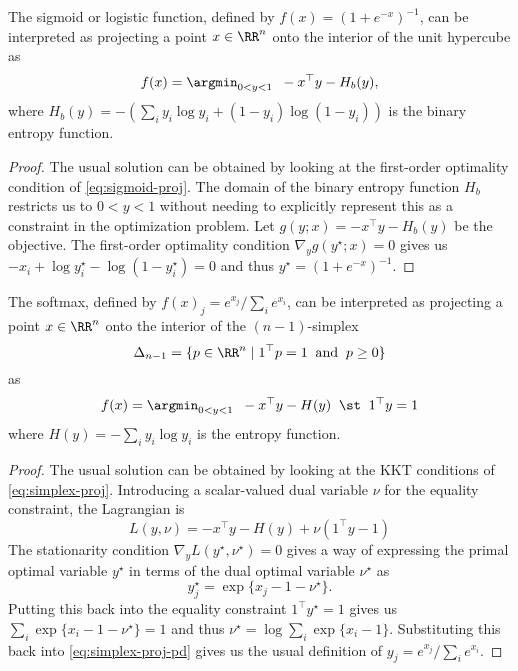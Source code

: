 \newpage
\begin{theorem}
  The sigmoid or logistic function, defined by $f(x) = (1+e^{-x})^{-1}$,
  can be interpreted as projecting a point $x\in\RR^n$ onto
  the interior of the unit hypercube as
  \begin{equation}
    f(x) = \argmin_{0<y<1} \;\; -x^\top y -H_b(y),
    \label{eq:sigmoid-proj}
  \end{equation}
  where $H_b(y) = - \left(\sum_i y_i\log y_i + (1-y_i)\log (1-y_i)\right)$ is the
  binary entropy function.
\end{theorem}

\begin{proof}
  The usual solution can be obtained by looking at
  the first-order optimality condition of
  \cref{eq:sigmoid-proj}.
  The domain of the binary entropy function $H_b$ restricts
  us to $0<y<1$ without needing to explicitly represent this
  as a constraint in the optimization problem.
  Let $g(y; x) = -x^\top y -H_b(y)$ be the objective.
  The first-order optimality condition $\nabla_y g(y^\star; x) = 0$
  gives us $-x_i + \log y_i^\star - \log (1-y_i^\star) = 0$
  and thus $y^\star = (1+e^{-x})^{-1}$.
\end{proof}

\begin{theorem}
  The softmax, defined by $f(x)_j = e^{x_j} / \sum_i e^{x_i}$,
  can be interpreted as projecting a point $x\in\RR^n$ onto
  the interior of the $(n-1)$-simplex
  $$\Delta_{n-1}=\{p\in\RR^n\; \vert\; 1^\top p = 1 \; \; {\rm and} \;\; p \geq 0 \}$$
  as
  \begin{equation}
    f(x) = \argmin_{0<y<1} \;\; -x^\top y - H(y) \;\; \st\;\; 1^\top y = 1
    \label{eq:simplex-proj}
  \end{equation}
  where $H(y) = -\sum_i y_i \log y_i$ is the entropy function.
\end{theorem}

\begin{proof}
  The usual solution can be obtained by looking at
  the KKT conditions of \cref{eq:simplex-proj}.
  Introducing a scalar-valued dual variable $\nu$ for the
  equality constraint, the Lagrangian is
  \begin{equation}
    L(y, \nu) = -x^\top y - H(y) + \nu(1^\top y - 1)
  \end{equation}
  The stationarity condition
  $\nabla_y L(y^\star, \nu^\star) = 0$
  gives a way of expressing the primal optimal
  variable $y^\star$ in terms of the dual optimal
  variable $\nu^\star$ as
  \begin{equation}
    \label{eq:simplex-proj-pd}
    y^\star_j=\exp\{x_j-1-\nu^\star\}.
  \end{equation}
  Putting this back into the equality constraint
  $1^\top y^\star = 1$ gives us
  $\sum_i \exp\{x_i-1-\nu^\star\} = 1$ and thus
  $\nu^\star = \log\sum_i\exp\{x_i-1\}$.
  Substituting this back into \cref{eq:simplex-proj-pd}
  gives us the usual definition of
  $y_j = e^{x_j} / \sum_i e^{x_i}$.
\end{proof}


